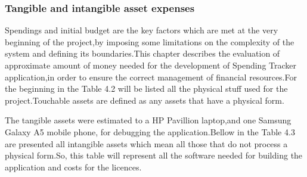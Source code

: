 \subsubsection{Tangible and intangible asset expenses}
Spendings and initial budget are the key factors which are met at the very beginning of the project,by imposing some limitations on the complexity of the system and defining its boundaries.This chapter describes the evaluation of approximate amount of money needed for the development of Spending Tracker application,in order to ensure the correct management of financial resources.For the beginning in the Table 4.2 will be listed all the physical stuff used for the project.Touchable assets are defined as any assets that have a physical form.
\begin{table}[H]
	\centering
	\caption{Tangible assets}
	\label{Tangible assets}
\end{table}
The tangible assets were estimated to a HP Pavillion laptop,and one Samsung Galaxy A5 mobile phone, for debugging the application.Bellow in the Table 4.3 are presented all intangible assets which mean all those that do not process a physical form.So, this table will represent all the software needed for building the application and costs for the licences.
\begin{table}[H]
	\centering
	\caption{Intangible assets}
	\label{Intangible assets}
\end{table}
